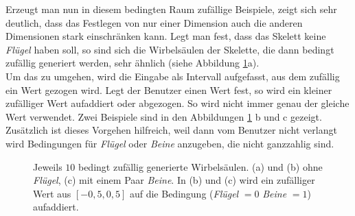 Erzeugt man nun in diesem bedingten Raum zufällige Beispiele, zeigt sich sehr deutlich, dass das Festlegen von nur einer Dimension auch die anderen Dimensionen stark einschränken kann. Legt man \zb fest, dass das Skelett keine \emph{Flügel} haben soll, so sind sich die Wirbelsäulen der Skelette, die dann bedingt zufällig generiert werden, sehr ähnlich (siehe Abbildung \ref{spine_variance}a).\\
 Um das zu umgehen, wird die Eingabe als Intervall aufgefasst, aus dem zufällig ein Wert gezogen wird. Legt der Benutzer einen Wert fest, so wird ein kleiner zufälliger Wert aufaddiert oder abgezogen. So wird nicht immer genau der gleiche Wert verwendet. Zwei Beispiele sind in den Abbildungen \ref{spine_variance} b und c gezeigt. Zusätzlich ist dieses Vorgehen hilfreich, weil dann vom Benutzer nicht verlangt wird Bedingungen für \emph{Flügel} oder \emph{Beine} anzugeben, die nicht ganzzahlig sind. 
 
 \begin{figure}
  \qquad
  \qquad
  
  \caption{Jeweils $10$ bedingt zufällig generierte Wirbelsäulen. (a) und (b) ohne \emph{Flügel}, (c) mit einem Paar \emph{Beine}. In (b) und (c) wird ein zufälliger Wert aus $[-0{,}5, 0{,}5]$ auf die Bedingung (\emph{Flügel} $= 0$ \bzw \emph{Beine} $= 1$) aufaddiert.}
  \label{spine_variance}
 \end{figure}


